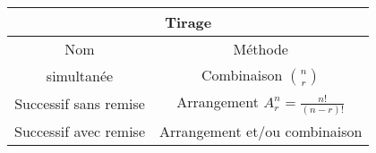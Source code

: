 \documentclass{article}
\begin{document}
\begin{tabular}{|cc|}
	\hline
	\multicolumn{2}{||c||}{\Large Tirage}                           \\ \hline\hline
	     \Large Nom       &                 Méthode                 \\ \hline
	     simultanée       &      Combinaison \(\binom{n}{r}\)       \\
	Successif sans remise & Arrangement \(A_r^n=\frac{n!}{(n-r)!}\) \\
	Successif avec remise &      Arrangement et/ou combinaison      \\ \hline
\end{tabular}
\end{document}

